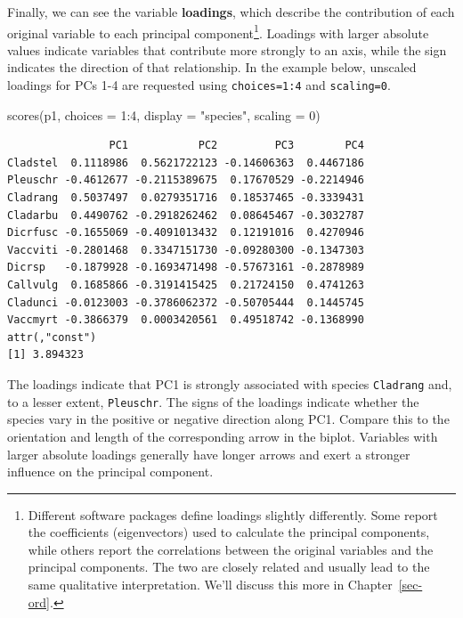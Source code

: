 \documentclass[
  13,
  letterpaper,
]{report}
\newenvironment{Shaded}{\begin{snugshade}}{\end{snugshade}}
\newcommand{\AttributeTok}[1]{\textcolor[rgb]{0.40,0.45,0.13}{#1}}
\newcommand{\DecValTok}[1]{\textcolor[rgb]{0.68,0.00,0.00}{#1}}
\newcommand{\FunctionTok}[1]{\textcolor[rgb]{0.28,0.35,0.67}{#1}}
\newcommand{\NormalTok}[1]{\textcolor[rgb]{0.00,0.23,0.31}{#1}}
\newcommand{\SpecialCharTok}[1]{\textcolor[rgb]{0.37,0.37,0.37}{#1}}
\newcommand{\StringTok}[1]{\textcolor[rgb]{0.13,0.47,0.30}{#1}}
\begin{document}
Finally, we can see the variable \textbf{loadings}, which describe the
contribution of each original variable to each principal
component\footnote{Different software packages define loadings slightly
  differently. Some report the coefficients (eigenvectors) used to
  calculate the principal components, while others report the
  correlations between the original variables and the principal
  components. The two are closely related and usually lead to the same
  qualitative interpretation. We'll discuss this more in
  Chapter~\ref{sec-ord}.}. Loadings with larger absolute values indicate
variables that contribute more strongly to an axis, while the sign
indicates the direction of that relationship. In the example below,
unscaled loadings for PCs 1-4 are requested using \texttt{choices=1:4}
and \texttt{scaling=0}.

\begin{Shaded}
\begin{Highlighting}[]
\FunctionTok{scores}\NormalTok{(p1, }\AttributeTok{choices =} \DecValTok{1}\SpecialCharTok{:}\DecValTok{4}\NormalTok{, }\AttributeTok{display =} \StringTok{"species"}\NormalTok{, }\AttributeTok{scaling =} \DecValTok{0}\NormalTok{)}
\end{Highlighting}
\end{Shaded}

\begin{verbatim}
                PC1           PC2         PC3        PC4
Cladstel  0.1118986  0.5621722123 -0.14606363  0.4467186
Pleuschr -0.4612677 -0.2115389675  0.17670529 -0.2214946
Cladrang  0.5037497  0.0279351716  0.18537465 -0.3339431
Cladarbu  0.4490762 -0.2918262462  0.08645467 -0.3032787
Dicrfusc -0.1655069 -0.4091013432  0.12191016  0.4270946
Vaccviti -0.2801468  0.3347151730 -0.09280300 -0.1347303
Dicrsp   -0.1879928 -0.1693471498 -0.57673161 -0.2878989
Callvulg  0.1685866 -0.3191415425  0.21724150  0.4741263
Cladunci -0.0123003 -0.3786062372 -0.50705444  0.1445745
Vaccmyrt -0.3866379  0.0003420561  0.49518742 -0.1368990
attr(,"const")
[1] 3.894323
\end{verbatim}

The loadings indicate that PC1 is strongly associated with species
\texttt{Cladrang} and, to a lesser extent, \texttt{Pleuschr}. The signs
of the loadings indicate whether the species vary in the positive or
negative direction along PC1. Compare this to the orientation and length
of the corresponding arrow in the biplot. Variables with larger absolute
loadings generally have longer arrows and exert a stronger influence on
the principal component.
\end{document}
